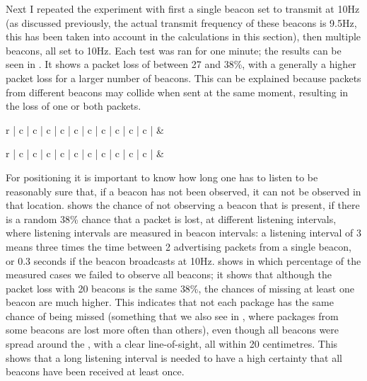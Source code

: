 Next I repeated the experiment with first a single beacon set to transmit at 10Hz (as discussed previously, the actual transmit frequency of these beacons is 9.5Hz, this has been taken into account in the calculations in this section), then multiple beacons, all set to 10Hz.
Each test was ran for one minute; the results can be seen in .
It shows a packet loss of between 27 and 38\%, with a generally a higher packet loss for a larger number of beacons.
This can be explained because packets from different beacons may collide when sent at the same moment, resulting in the loss of one or both packets.

\begin{table}
    \begin{tabular}{r | c | c | c | c | c | c | c | c | c | c |}
        &  \\
    \end{tabular}
    \caption{Expected chance that not all beacons have been observed at different listening intervals, with a random packet-loss of 38\%}
    \label{tbl:rss-packet-loss}
\end{table}

\begin{table}
    \begin{tabular}{r | c | c | c | c | c | c | c | c | c | c |}
        &  \\
    \end{tabular}
    \caption{Measured chance that not all beacons have been observed at different listening intervals}
    \label{tbl:rss-packet-loss-empirical}
\end{table}
For positioning it is important to know how long one has to listen to be reasonably sure that, if a beacon has not been observed, it can not be observed in that location.
 shows the chance of not observing a beacon that is present, if there is a random 38\% chance that a packet is lost, at different listening intervals, where listening intervals are measured in beacon intervals: a listening interval of 3 means three times the time between 2 advertising packets from a single beacon, or 0.3 seconds if the beacon broadcasts at 10Hz.
 shows in which percentage of the measured cases we failed to observe all beacons; it shows that although the packet loss with 20 beacons is the same 38\%, the chances of missing at least one beacon are much higher.
This indicates that not each package has the same chance of being missed (something that we also see in , where packages from some beacons are lost more often than others), even though all beacons were spread around the \device, with a clear line-of-sight, all within 20 centimetres.
This shows that a long listening interval is needed to have a high certainty that all beacons have been received at least once.

